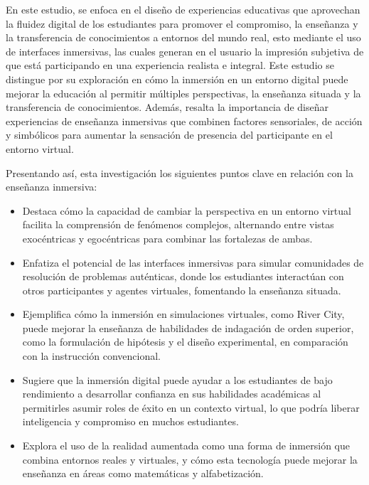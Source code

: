 
En este estudio, \citeauthor{dede2009immersive} \citeyear{dede2009immersive} se enfoca en el diseño de experiencias educativas que aprovechan la fluidez digital de los estudiantes para promover el compromiso, la enseñanza y la transferencia de conocimientos a entornos del mundo real, esto mediante el uso de interfaces inmersivas, las cuales generan en el usuario la impresión subjetiva de que está participando en una experiencia realista e integral. Este estudio se distingue por su exploración en cómo la inmersión en un entorno digital puede mejorar la educación al permitir múltiples perspectivas, la enseñanza situada y la transferencia de conocimientos. Además, resalta la importancia de diseñar experiencias de enseñanza inmersivas que combinen factores sensoriales, de acción y simbólicos para aumentar la sensación de presencia del participante en el entorno virtual.

Presentando así, esta investigación los siguientes puntos clave en relación con la enseñanza inmersiva:

\begin{itemize}
  \item Destaca cómo la capacidad de cambiar la perspectiva en un entorno virtual facilita la comprensión de fenómenos complejos, alternando entre vistas exocéntricas y egocéntricas para combinar las fortalezas de ambas.
  \item Enfatiza el potencial de las interfaces inmersivas para simular comunidades de resolución de problemas auténticas, donde los estudiantes interactúan con otros participantes y agentes virtuales, fomentando la enseñanza situada.
  \item Ejemplifica cómo la inmersión en simulaciones virtuales, como River City, puede mejorar la enseñanza de habilidades de indagación de orden superior, como la formulación de hipótesis y el diseño experimental, en comparación con la instrucción convencional.
  \item Sugiere que la inmersión digital puede ayudar a los estudiantes de bajo rendimiento a desarrollar confianza en sus habilidades académicas al permitirles asumir roles de éxito en un contexto virtual, lo que podría liberar inteligencia y compromiso en muchos estudiantes.
  \item Explora el uso de la realidad aumentada como una forma de inmersión que combina entornos reales y virtuales, y cómo esta tecnología puede mejorar la enseñanza en áreas como matemáticas y alfabetización.
\end{itemize}


